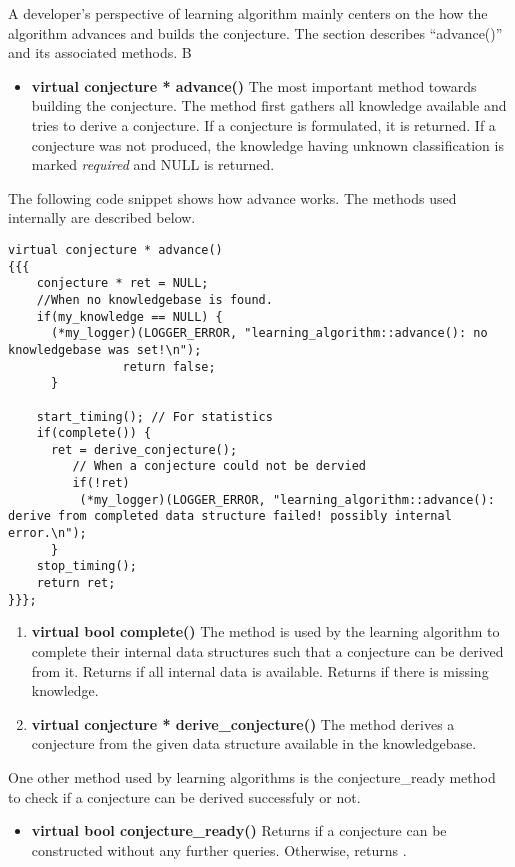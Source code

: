 A developer's perspective of learning algorithm mainly centers on the how the algorithm advances and builds the conjecture. The section describes ``advance()'' and its associated methods. B

\begin{itemize}
 \item \textbf{virtual conjecture * advance()} \vskip 1pt
	The most important method towards building the conjecture. The method first gathers all knowledge available and tries to derive a conjecture. If a conjecture is formulated, it is returned. If a conjecture was not produced, the knowledge having unknown classification is marked \emph{required} and NULL is returned. \\
\end{itemize}

The following code snippet shows how advance works. The methods used internally are described below.
\begin{lstlisting}
virtual conjecture * advance()
{{{
	conjecture * ret = NULL;
	//When no knowledgebase is found.
	if(my_knowledge == NULL) { 
	  (*my_logger)(LOGGER_ERROR, "learning_algorithm::advance(): no knowledgebase was set!\n");
				return false;
	  }
	 
	start_timing(); // For statistics
	if(complete()) {
	  ret = derive_conjecture();
	     // When a conjecture could not be dervied
	     if(!ret)
	      (*my_logger)(LOGGER_ERROR, "learning_algorithm::advance(): derive from completed data structure failed! possibly internal error.\n");
	  }
	stop_timing(); 
	return ret;
}}}; 
\end{lstlisting}


\begin{enumerate}
 
\item \textbf{virtual bool complete()} \vskip 1pt
	The method is used by the learning algorithm to complete their internal data structures such that a conjecture can be derived from it. Returns \true if all internal data is available. Returns \false if there is missing knowledge. 

 \item \textbf{virtual conjecture * derive\_conjecture()} \vskip 1pt
	The method derives a conjecture from the given data structure available in the knowledgebase. 
\end{enumerate}

One other method used by learning algorithms is the conjecture\_ready method to check if a conjecture can be derived successfuly or not.
\begin{itemize}
  \item \textbf{virtual bool conjecture\_ready()} \vskip 1pt
	Returns \true if a conjecture can be constructed without any further queries. Otherwise, returns \false.
\end{itemize}






